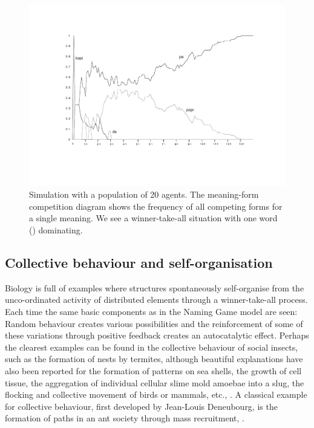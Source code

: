 \begin{figure}[htbp]
  \centerline{\includegraphics[width=\textwidth]{chap5/figs/comp1.pdf}}
\caption{\label{competition}Simulation with 
a population of 20 agents. The meaning-form competition 
diagram shows the frequency of all competing forms for a 
single meaning. We see a winner-take-all situation
with one word () dominating.}
\end{figure}

\subsection{Collective behaviour and self-organisation}

Biology is full of examples where structures spontaneously 
self-organise from the unco-ordinated activity 
of distributed elements through a winner-take-all process.
Each time the same basic components as in the Naming Game model
are seen: Random behaviour creates various possibilities and the 
reinforcement of some of these variations through positive
feedback creates an autocatalytic effect. 
Perhaps the clearest examples can be found 
in the collective behaviour of 
social insects, such as the formation of nests by termites, 
although beautiful explanations have also been reported
for the formation of patterns on sea shells, the growth of
cell tissue, the aggregation
of individual cellular slime mold amoebae into a slug, 
the flocking and collective movement of birds or mammals, 
etc., \cite{Meinhardt:1982}. A classical 
example for collective behaviour, first developed by Jean-Louis 
Deneubourg, is the formation of paths in an ant society through 
mass recruitment, \cite{Pasteels:1987}. 


